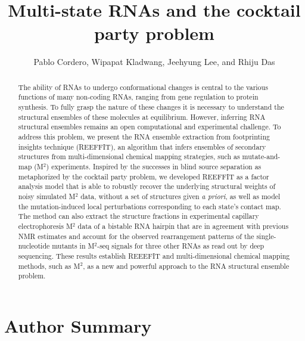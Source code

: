 \documentclass[12pt]{article}
\title{Multi-state RNAs and the cocktail party problem}
\author{Pablo Cordero, Wipapat Kladwang, Jeehyung Lee, and Rhiju Das}
\begin{document}
\maketitle

\begin{abstract}
The ability of RNAs to undergo conformational changes is central to the various functions of many non-coding RNAs, ranging from gene regulation to protein synthesis. To fully grasp the nature of these changes it is necessary to understand the structural ensembles of these molecules at equilibrium. However, inferring RNA structural ensembles remains an open computational and experimental challenge. To address this problem, we present the RNA ensemble extraction from footprinting insights technique (REEFFIT), an algorithm that infers ensembles of secondary structures from multi-dimensional chemical mapping strategies, such as mutate-and-map (M$^2$) experiments. Inspired by the successes in blind source separation as metaphorized by the cocktail party problem, we developed REEFFIT as a factor analysis model that is able to robustly recover the underlying structural weights of noisy simulated M$^2$ data, without a set of structures given \textit{a priori}, as well as model the mutation-induced local perturbations corresponding to each state's contact map. The method can also extract the structure fractions in experimental capillary electrophoresis M$^2$ data of a bistable RNA hairpin that are in agreement with previous NMR estimates and account for the observed rearrangement patterns of the single-nucleotide mutants in M$^2$-seq signals for three other RNAs as read out by deep sequencing. These results establish REEEFIT and multi-dimensional chemical mapping methods, such as M$^2$, as a new and powerful approach to the RNA structural ensemble problem.
\end{abstract}

\section{Author Summary}
\end{document}
